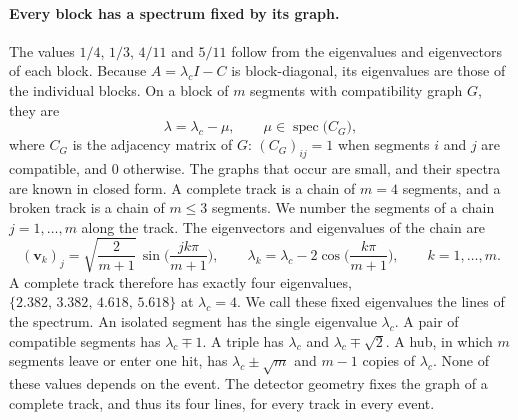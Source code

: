 \documentclass[11pt,a4paper]{article}
\newenvironment{gssblock}{\color{teal}}{}%
\begin{document}
\begin{gssblock}
\paragraph{Every block has a spectrum fixed by its graph.}
The values $1/4$, $1/3$, $4/11$ and $5/11$ follow from the eigenvalues and eigenvectors of each
block. Because $A=\lambda_cI-C$ is block-diagonal, its eigenvalues are those of the individual blocks.
On a block of $m$ segments with compatibility graph $G$, they are
\begin{equation}
\lambda=\lambda_c-\mu,\qquad \mu\in\operatorname{spec}\big(C_G\big),
\end{equation}
where $C_G$ is the adjacency matrix of $G$: $(C_G)_{ij}=1$ when segments $i$ and $j$ are compatible,
and $0$ otherwise. The graphs that occur are small, and their spectra are known in closed form.
A complete track is a chain of $m=4$ segments, and a broken track is a chain of $m\le3$ segments.
We number the segments of a chain $j=1,\dots,m$ along the track. The eigenvectors and eigenvalues of
the chain are
\begin{equation}
\label{eq:chain:r1}
(\mathbf{v}_k)_j=\sqrt{\frac{2}{m+1}}\,\sin\!\Big(\frac{jk\pi}{m+1}\Big),\qquad
\lambda_k=\lambda_c-2\cos\!\Big(\frac{k\pi}{m+1}\Big),\qquad k=1,\dots,m .
\end{equation}
A complete track therefore has exactly four eigenvalues, $\{2.382,\,3.382,\,4.618,\,5.618\}$ at
$\lambda_c=4$. We call these fixed eigenvalues the lines of the spectrum. An isolated segment has the
single eigenvalue $\lambda_c$. A pair of compatible segments has $\lambda_c\mp1$. A triple has
$\lambda_c$ and $\lambda_c\mp\sqrt2$. A hub, in which $m$ segments leave or enter one hit, has
$\lambda_c\pm\sqrt m$ and $m-1$ copies of $\lambda_c$. None of these values depends on the event. The
detector geometry fixes the graph of a complete track, and thus its four lines, for every track in
every event.


\end{gssblock}
\end{document}

